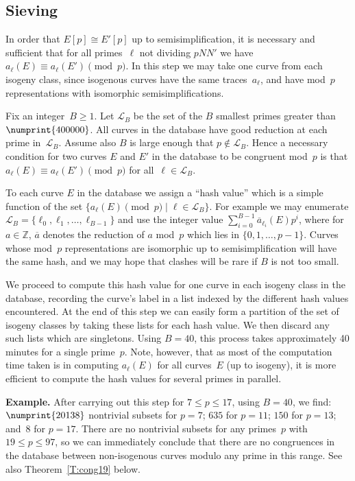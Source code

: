 \documentclass[12pt, reqno]{amsart}
\newcommand{\Z}{\mathbb{Z}}
\newcommand{\calL}{\mathcal{L}}
\numberwithin{equation}{section}
\theoremstyle{definition}
\theoremstyle{remark}
\begin{document}
\subsection{Sieving}
In order that $E[p]\cong E'[p]$ up to semisimplification, it is
necessary and sufficient that for all primes~$\ell$ not dividing
$pNN'$ we have $a_{\ell}(E)\equiv a_{\ell}(E')\pmod{p}$.  In this step
we may take one curve from each isogeny class, since isogenous curves
have the same traces~$a_\ell$, and have mod~$p$ representations with
isomorphic semisimplifications.

Fix an integer~$B\ge1$.  Let $\calL_B$ be the set of the $B$ smallest
primes greater than $\numprint{400000}$. All curves in the database
have good reduction at each prime in~$\calL_B$.  Assume also $B$ is
large enough that $p\notin\calL_B$.  Hence a necessary condition for
two curves $E$ and $E'$ in the database to be congruent mod~$p$ is
that $a_{\ell}(E)\equiv a_{\ell}(E')\pmod{p}$ for all~$\ell\in\calL_B$.

To each curve $E$ in the database we assign a ``hash value'' which is
a simple function of the set $\{a_{\ell}(E)\pmod{p}\mid
\ell\in\calL_B\}$.  For example we may enumerate
$\calL_B=\{\ell_0,\ell_1,\dots,\ell_{B-1}\}$ and use the integer value
$\sum_{i=0}^{B-1}\overline{a}_{\ell_i}(E)p^i$, where for $a\in\Z$,
$\overline{a}$ denotes the reduction of $a$ mod~$p$ which lies in
$\{0,1,\dots,p-1\}$.  Curves whose mod~$p$ representations are
isomorphic up to semisimplification will have the same hash, and we
may hope that clashes will be rare if $B$ is not too small.

We proceed to compute this hash value for one curve in each isogeny
class in the database, recording the curve's label in a list indexed
by the different hash values encountered.  At the end of this step we
can easily form a partition of the set of isogeny classes by taking
these lists for each hash value.  We then discard any such lists which
are singletons.  Using $B=40$, this process takes approximately 40
minutes for a single prime~$p$.  Note, however, that as most of the
computation time taken is in computing $a_{\ell}(E)$ for all
curves~$E$ (up to isogeny), it is more efficient to compute the hash
values for several primes in parallel.

{\bf Example.} After carrying out this step for $7\le p\le17$, using
$B=40$, we find: $\numprint{20138}$ nontrivial subsets for $p=7$;
$635$ for $p=11$; $150$ for $p=13$; and~$8$ for $p=17$.  There are no
nontrivial subsets for any primes~$p$ with $19\le p\le97$, so we can
immediately conclude that there are no congruences in the database
between non-isogenous curves modulo any prime in this range.  See also
Theorem~\ref{T:cong19} below.
\end{document}
